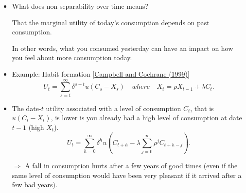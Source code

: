 \begin{frame}{}
\begin{footnotesize}
\begin{itemize}
	\item What does {\color{blue}non-separability over time} means?
	
	That the marginal utility of today's consumption depends on past consumption.
	
	
	In other words, 	what you consumed yesterday can have an impact on how you feel about more consumption today.

	
	\item Example: {\color{blue}Habit formation} [\href{http://faculty.chicagobooth.edu/john.cochrane/research/papers/campbell_cochrane_by_force_of_habit_(jpe).pdf}{Campbell and Cochrane (1999)}]
	\begin{equation}\label{eq:Uhabit_nonstoch}
	U_t = \sum_{s=t}^{\infty} \delta^{s-t} u(C_s - X_s) \quad where \quad X_t = \rho X_{t-1} + \lambda C_t.
	\end{equation}
	
	\item The date-$t$ utility associated with a level of consumption $C_t$, that is $u(C_t - X_t)$, is lower is you already had a high level of consumption at date $t-1$ (high $X_t$).
	$$
	U_t = \sum_{h=0}^{\infty} \delta^{h}u\left(C_{t+h} - \lambda \sum_{j=0}^\infty \rho^j C_{t+h-j}\right).
	$$
	
	\item[$\Rightarrow$] A fall in consumption hurts after a few years of good times (even if the same level of consumption would have been very pleasant if it arrived after a few bad years).
\end{itemize}
\end{footnotesize}
\end{frame}

